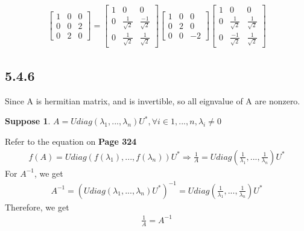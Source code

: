 \documentclass{article}
\newtheorem*{suppose}{Suppose}
\begin{document}
\begin{equation*}
    \begin{split}
        \begin{bmatrix}
            1 & 0 & 0 \\ 0 & 0 & 2 \\ 0 & 2 & 0
        \end{bmatrix} = \begin{bmatrix}
            1 & 0 &0  \\ 0 & \frac{1}{\sqrt{2}} & \frac{-1}{\sqrt{2}} \\ 0 & \frac{1}{\sqrt{2}} & \frac{1}{\sqrt{2}}
        \end{bmatrix} \begin{bmatrix}
            1 & 0 & 0 \\ 0 & 2 & 0 \\0 & 0 & -2 
        \end{bmatrix}\begin{bmatrix}
            1 & 0 &0  \\ 0 & \frac{1}{\sqrt{2}} & \frac{1}{\sqrt{2}} \\ 0 & \frac{-1}{\sqrt{2}} & \frac{1}{\sqrt{2}}
        \end{bmatrix}
    \end{split}
\end{equation*}
\subsection*{5.4.6}

\noindent Since A is hermitian matrix, and is invertible, so all eignvalue of A are nonzero.
\begin{suppose}
    $A = Udiag(\lambda_1, ..., \lambda_n)U^*, \forall i \in {1, ..., n}, \lambda_i \ne 0$
\end{suppose}
Refer to the equation on \textbf{Page 324}
\begin{equation*}
    \begin{split}
        f(A) = Udiag(f(\lambda_1), ... , f(\lambda_n))U^* \Rightarrow \frac{1}{A} = Udiag(\frac{1}{\lambda _1}, ... , \frac{1}{\lambda _n})U^*
    \end{split} 
\end{equation*}
For $A^{-1}$, we get\begin{equation*}
    \begin{split}
        A^{-1} =  (Udiag(\lambda_1, ..., \lambda_n)U^*)^{-1} = Udiag(\frac{1}{\lambda _1}, ... , \frac{1}{\lambda _n})U^*
    \end{split}
\end{equation*}
Therefore, we get\begin{equation*}
    \begin{split}
        \frac{1}{A} = A^{-1}
    \end{split}
\end{equation*}
\end{document}

